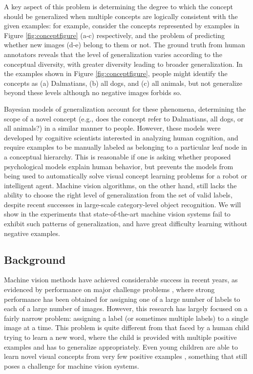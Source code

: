 A key aspect of this problem is determining the degree to which the concept should be generalized \cite{xu2007word} when multiple concepts are logically consistent with the given examples: for example, consider the concepts represented by examples in Figure \ref{fig:conceptfigure} (a-c) respectively, and the problem of predicting whether new images (d-e) belong to them or not.  The ground truth from human annotators reveals that the level of generalization varies according to the conceptual diversity, with greater diversity leading to broader generalization. In the examples shown in Figure \ref{fig:conceptfigure}, people might identify the concepts as (a) Dalmatians, (b) all dogs, and (c) all animals, but not generalize beyond these levels although no negative images forbids so.

Bayesian models of generalization \cite{abbottconstructing, tenenbaum99, xu2007word} account for these phenomena, determining the scope of a novel concept (e.g., does the concept refer to Dalmatians, all dogs, or all animals?) in a similar manner to people. However, these models were developed by cognitive scientists interested in analyzing human cognition, and require examples to be manually labeled as belonging to a particular leaf node in a conceptual hierarchy. This is reasonable if one is asking whether proposed psychological models explain human behavior, but prevents the models from being used to automatically solve visual concept learning problems for a robot or intelligent agent. Machine vision algorithms, on the other hand, still lacks the ability to choose the right level of generalization from the set of valid labels, despite recent successes in large-scale category-level object recognition. We will show in the experiments that state-of-the-art machine vision systems fail to exhibit such patterns of generalization, and have great difficulty learning without negative examples.

\subsection{Background}

Machine vision methods have achieved considerable success in recent years, as evidenced by performance on major challenge problems \cite{imagenet,pascal}, where strong performance has been obtained for assigning one of a large number of labels to each of a large number of images. However, this research has largely focused on a fairly narrow problem: assigning a label (or sometimes multiple labels) to a single image at a time. This problem is quite different from that faced by a human child trying to learn a new word, where the child is provided with multiple positive examples and has to generalize appropriately. Even young children are able to learn novel visual concepts from very few positive examples \cite{carey1978}, something that still poses a challenge for machine vision systems.

